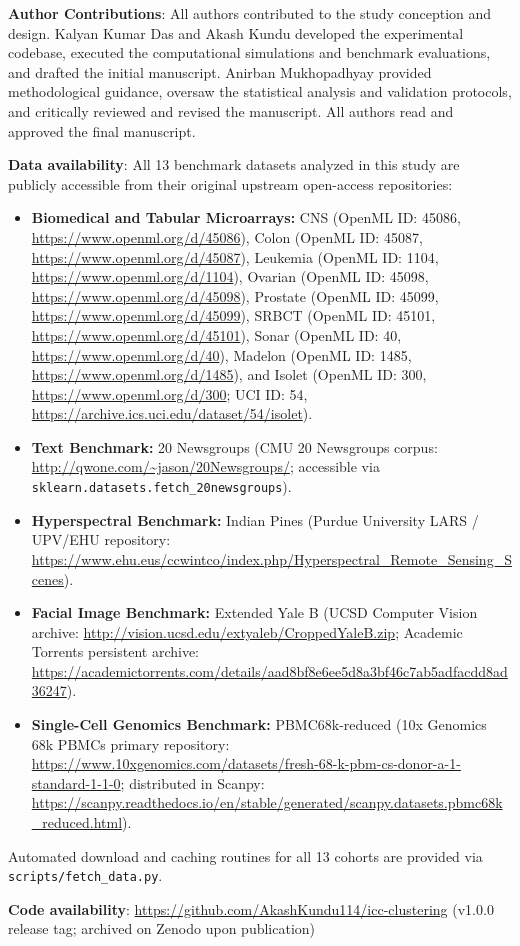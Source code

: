 \documentclass[pdflatex,sn-mathphys-num]{sn-jnl}
\theoremstyle{thmstyleone}
\theoremstyle{thmstyletwo}
\theoremstyle{thmstylethree}
\begin{document}
\textbf{Author Contributions}: All authors contributed to the study conception and design. Kalyan Kumar Das and Akash Kundu developed the experimental codebase, executed the computational simulations and benchmark evaluations, and drafted the initial manuscript. Anirban Mukhopadhyay provided methodological guidance, oversaw the statistical analysis and validation protocols, and critically reviewed and revised the manuscript. All authors read and approved the final manuscript.

\textbf{Data availability}: All 13 benchmark datasets analyzed in this study are publicly accessible from their original upstream open-access repositories:
\begin{itemize}
 \item \textbf{Biomedical and Tabular Microarrays:} CNS (OpenML ID: 45086, \url{https://www.openml.org/d/45086}), Colon (OpenML ID: 45087, \url{https://www.openml.org/d/45087}), Leukemia (OpenML ID: 1104, \url{https://www.openml.org/d/1104}), Ovarian (OpenML ID: 45098, \url{https://www.openml.org/d/45098}), Prostate (OpenML ID: 45099, \url{https://www.openml.org/d/45099}), SRBCT (OpenML ID: 45101, \url{https://www.openml.org/d/45101}), Sonar (OpenML ID: 40, \url{https://www.openml.org/d/40}), Madelon (OpenML ID: 1485, \url{https://www.openml.org/d/1485}), and Isolet (OpenML ID: 300, \url{https://www.openml.org/d/300}; UCI ID: 54, \url{https://archive.ics.uci.edu/dataset/54/isolet}).
 \item \textbf{Text Benchmark:} 20 Newsgroups (CMU 20 Newsgroups corpus: \url{http://qwone.com/~jason/20Newsgroups/}; accessible via \texttt{sklearn.datasets.fetch\_20newsgroups}).
 \item \textbf{Hyperspectral Benchmark:} Indian Pines (Purdue University LARS / UPV/EHU repository: \url{https://www.ehu.eus/ccwintco/index.php/Hyperspectral_Remote_Sensing_Scenes}).
 \item \textbf{Facial Image Benchmark:} Extended Yale B (UCSD Computer Vision archive: \url{http://vision.ucsd.edu/extyaleb/CroppedYaleB.zip}; Academic Torrents persistent archive: \url{https://academictorrents.com/details/aad8bf8e6ee5d8a3bf46c7ab5adfacdd8ad36247}).
 \item \textbf{Single-Cell Genomics Benchmark:} PBMC68k-reduced (10x Genomics 68k PBMCs primary repository: \url{https://www.10xgenomics.com/datasets/fresh-68-k-pbm-cs-donor-a-1-standard-1-1-0}; distributed in Scanpy: \url{https://scanpy.readthedocs.io/en/stable/generated/scanpy.datasets.pbmc68k_reduced.html}).
\end{itemize}
Automated download and caching routines for all 13 cohorts are provided via \texttt{scripts/fetch\_data.py}.

\textbf{Code availability}: \url{https://github.com/AkashKundu114/icc-clustering} (v1.0.0 release tag; archived on Zenodo upon publication)


\end{document}
